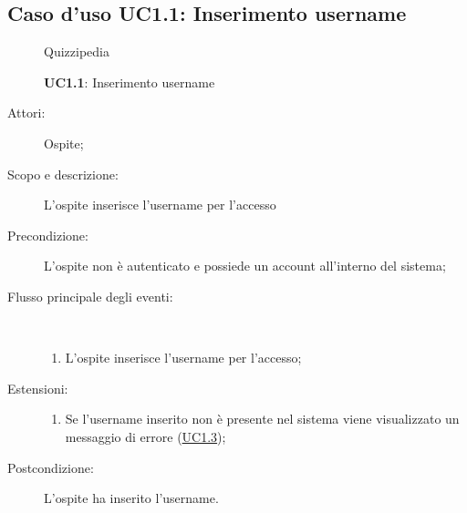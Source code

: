 \subsection{Caso d'uso UC1.1: Inserimento username}
\begin{figure}[H]
	\centering
	\begin{resizedtikzpicture}{\textwidth}
		\begin{umlsystem}[x=0, fill=lightgray!20]{Quizzipedia}
		\end{umlsystem}
	\end{resizedtikzpicture}
	\caption{\textbf{UC1.1}: Inserimento username}
	\label{UC1.1}
\end{figure}
\begin{description}
	\item[Attori:] Ospite;
	\item[Scopo e descrizione:] L'ospite inserisce l'username per l'accesso
	\item[Precondizione:] L'ospite non è autenticato e possiede un account all'interno del sistema;
	
	\item[Flusso principale degli eventi:] \ 
	\begin{enumerate}
		\item L'ospite inserisce l'username per l'accesso;
		
	\end{enumerate}
	\item[Estensioni:]
	\begin{enumerate}
		\item Se l'username inserito non è presente nel sistema viene visualizzato un messaggio di errore (\hyperlink{UC1.3}{UC1.3});
		
	\end{enumerate}
	\item[Postcondizione:] L'ospite ha inserito l'username.
\end{description}
\hypertarget{UC1.2}{}
